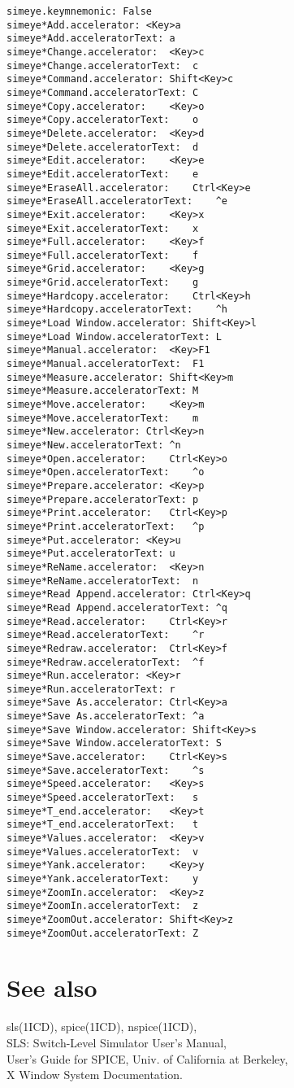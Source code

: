 \begin{verbatim}
simeye.keymnemonic:	False
simeye*Add.accelerator:	<Key>a
simeye*Add.acceleratorText:	a
simeye*Change.accelerator:	<Key>c
simeye*Change.acceleratorText:	c
simeye*Command.accelerator:	Shift<Key>c
simeye*Command.acceleratorText:	C
simeye*Copy.accelerator:	<Key>o
simeye*Copy.acceleratorText:	o
simeye*Delete.accelerator:	<Key>d
simeye*Delete.acceleratorText:	d
simeye*Edit.accelerator:	<Key>e
simeye*Edit.acceleratorText:	e
simeye*EraseAll.accelerator:	Ctrl<Key>e
simeye*EraseAll.acceleratorText:	^e
simeye*Exit.accelerator:	<Key>x
simeye*Exit.acceleratorText:	x
simeye*Full.accelerator:	<Key>f
simeye*Full.acceleratorText:	f
simeye*Grid.accelerator:	<Key>g
simeye*Grid.acceleratorText:	g
simeye*Hardcopy.accelerator:	Ctrl<Key>h
simeye*Hardcopy.acceleratorText:	^h
simeye*Load Window.accelerator:	Shift<Key>l
simeye*Load Window.acceleratorText:	L
simeye*Manual.accelerator:	<Key>F1
simeye*Manual.acceleratorText:	F1
simeye*Measure.accelerator:	Shift<Key>m
simeye*Measure.acceleratorText:	M
simeye*Move.accelerator:	<Key>m
simeye*Move.acceleratorText:	m
simeye*New.accelerator:	Ctrl<Key>n
simeye*New.acceleratorText:	^n
simeye*Open.accelerator:	Ctrl<Key>o
simeye*Open.acceleratorText:	^o
simeye*Prepare.accelerator:	<Key>p
simeye*Prepare.acceleratorText:	p
simeye*Print.accelerator:	Ctrl<Key>p
simeye*Print.acceleratorText:	^p
simeye*Put.accelerator:	<Key>u
simeye*Put.acceleratorText:	u
simeye*ReName.accelerator:	<Key>n
simeye*ReName.acceleratorText:	n
simeye*Read Append.accelerator:	Ctrl<Key>q
simeye*Read Append.acceleratorText:	^q
simeye*Read.accelerator:	Ctrl<Key>r
simeye*Read.acceleratorText:	^r
simeye*Redraw.accelerator:	Ctrl<Key>f
simeye*Redraw.acceleratorText:	^f
simeye*Run.accelerator:	<Key>r
simeye*Run.acceleratorText:	r
simeye*Save As.accelerator:	Ctrl<Key>a
simeye*Save As.acceleratorText:	^a
simeye*Save Window.accelerator:	Shift<Key>s
simeye*Save Window.acceleratorText:	S
simeye*Save.accelerator:	Ctrl<Key>s
simeye*Save.acceleratorText:	^s
simeye*Speed.accelerator:	<Key>s
simeye*Speed.acceleratorText:	s
simeye*T_end.accelerator:	<Key>t
simeye*T_end.acceleratorText:	t
simeye*Values.accelerator:	<Key>v
simeye*Values.acceleratorText:	v
simeye*Yank.accelerator:	<Key>y
simeye*Yank.acceleratorText:	y
simeye*ZoomIn.accelerator:	<Key>z
simeye*ZoomIn.acceleratorText:	z
simeye*ZoomOut.accelerator:	Shift<Key>z
simeye*ZoomOut.acceleratorText:	Z
\end{verbatim}

\section{See also}
sls(1ICD),
spice(1ICD),
nspice(1ICD),\\
SLS: Switch-Level Simulator User's Manual,\\
User's Guide for SPICE, Univ. of California at Berkeley,\\
X Window System Documentation. 
\cleardoublepage
